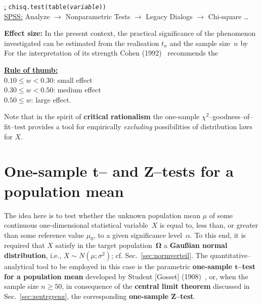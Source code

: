 \medskip
\noindent
\underline{\R:} \texttt{chisq.test(table(\textit{variable}))} \\
\underline{SPSS:} Analyze $\rightarrow$ Nonparametric Tests
$\rightarrow$ Legacy Dialogs $\rightarrow$ Chi-square \ldots

\medskip
\noindent
\textbf{Effect size:} In the present context, the practical
significance of the phenomenon investigated can be estimated
from the realisation $t_{n}$ and the sample size~$n$ by
%
\be
{}
\ee
%
For the interpretation of its strength Cohen 
(1992)~ recommends the

\medskip
\noindent
\underline{\textbf{Rule of thumb:}}\\
$0.10 \leq w < 0.30$: small effect\\
$0.30 \leq w < 0.50$: medium effect\\
$0.50 \leq w$: large effect.

\medskip
\noindent
Note that in the spirit of \textbf{critical rationalism} the 
one-sample $\chi^{2}$--goodness--of--fit--test provides a tool for 
empirically \textit{excluding} possibilities of distribution laws 
for $X$.

\section[One-sample $t$-- and $Z$--tests for a population 
mean]{One-sample $\boldsymbol{t}$-- and $\boldsymbol{Z}$--tests 
for a population mean}
The idea here is to test whether the unknown population mean $\mu$ 
of some continuous one-dimensional statistical variable~$X$ is 
equal to, less than, or greater than some reference value 
$\mu_{0}$, to a given significance level~$\alpha$. To this end, it 
is required that $X$ satisfy in the target 
population~$\boldsymbol{\Omega}$ a \textbf{Gau\ss ian normal 
distribution}, i.e., $X \sim N(\mu;\sigma^{2})$; cf. 
Sec.~\ref{sec:normverteil}. The quantitative--analytical tool to 
be employed in this case is the parametric \textbf{one-sample 
$\boldsymbol{t}$--test for a population mean} developed by Student 
[Gosset] (1908)~, or, when the sample size $n \geq 
50$, in consequence of the \textbf{central limit theorem} discussed 
in Sec.~\ref{sec:zentrgrenz}, the corresponding
\textbf{one-sample $\boldsymbol{Z}$--test}.

